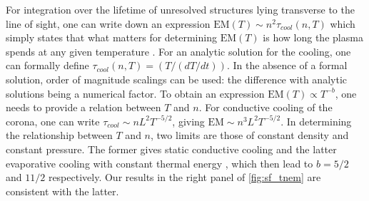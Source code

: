 \documentclass[apj]{emulateapj}
\begin{document}
		\par For integration over the lifetime of unresolved structures lying transverse to the line of sight, one can write down an expression $\mathrm{EM}(T) \sim n^2\tau_{cool}(n, T)$ which simply states that what matters for determining $\mathrm{EM}(T)$ is how long the plasma spends at any given temperature \citep[e.g.][]{cargill_implications_1994,cargill_nanoflare_2004}. For an analytic solution for the cooling, one can formally define $\tau_{cool}(n, T) = (T/(dT/dt))$. In the absence of a formal solution, order of magnitude scalings can be used: the difference with analytic solutions being a numerical factor. To obtain an expression $\mathrm{EM}(T)\propto T^{-b}$, one needs to provide a relation between $T$ and $n$. For conductive cooling of the corona, one can write $\tau_{cool} \sim nL^2T^{-5/2}$, giving $\mathrm{EM} \sim n^3L^2T^{-5/2}$. In determining the relationship between $T$ and $n$, two limits are those of constant density and constant pressure. The former gives static conductive cooling \citep[e.g.][]{antiochos_influence_1976} and the latter evaporative cooling with constant thermal energy \citep[e.g.][]{antiochos_evaporative_1978}, which then lead to $b = 5/2$ and $11/2$ respectively. Our results in the right panel of \autoref{fig:sf_tnem} are consistent with the latter.
\end{document}
